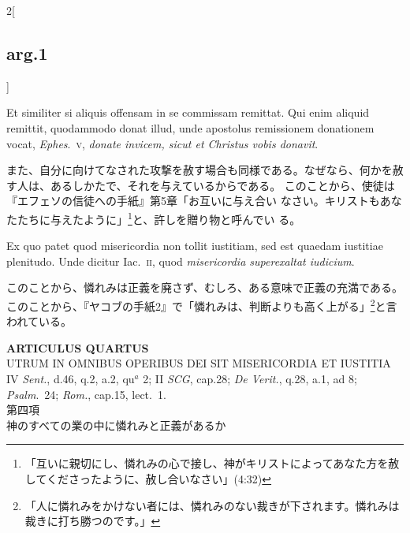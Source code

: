 \documentclass[paper=a4paper,fontsize=10pt,jafontsize=9pt,titlepage]{jlreq}
\begin{document}
\begin{paracol}{2}[\subsection{arg.1}]
\switchcolumn*

Et similiter si aliquis offensam in se
commissam remittat. 
Qui enim aliquid remittit, quodammodo donat illud,
unde apostolus remissionem donationem vocat, {\itshape Ephes}.~{\scshape v}, {\itshape donate invicem,
sicut et Christus vobis donavit}.

\switchcolumn

また、自分に向けてなされた攻撃を赦す場合も同様である。なぜなら、何かを赦
 す人は、あるしかたで、それを与えているからである。
このことから、使徒は『エフェソの信徒への手紙』第5章「お互いに与え合い
 なさい。キリストもあなたたちに与えたように」\footnote{「互いに親切にし、憐れみの心で接し、神がキリストによってあなた方を赦してくださったように、赦し合いなさい」(4:32)}と、許しを贈り物と呼んでい
 る。

\switchcolumn*

Ex quo patet quod misericordia non
tollit iustitiam, sed est quaedam iustitiae plenitudo. Unde dicitur
Iac.~{\scshape ii}, quod {\itshape misericordia superexaltat iudicium}.

\switchcolumn

このことから、憐れみは正義を廃さず、むしろ、ある意味で正義の充満である。
 このことから、『ヤコブの手紙2』で「憐れみは、判断よりも高く上がる」\footnote{「人に憐れみをかけない者には、憐れみのない裁きが下されます。憐れみは裁きに打ち勝つのです。」}と言
 われている。

\end{paracol}
\newpage
{}
{}
\setcounter{section}{4}
\setcounter{subsection}{0}





\begin{center}
 {\Large {\bfseries ARTICULUS QUARTUS}}\\
 {\large UTRUM IN OMNIBUS OPERIBUS DEI SIT MISERICORDIA ET IUSTITIA}\\
 {\footnotesize IV {\itshape Sent.}, d.46, q.2, a.2, qu$^a$ 2; II
 {\itshape SCG}, cap.28; {\itshape De Verit.}, q.28, a.1, ad 8;
 {\itshape Psalm}.~24; {\itshape Rom.}, cap.15, lect.~1.}\\
 {\Large 第四項\\神のすべての業の中に憐れみと正義があるか}
\end{center}
\end{document}
